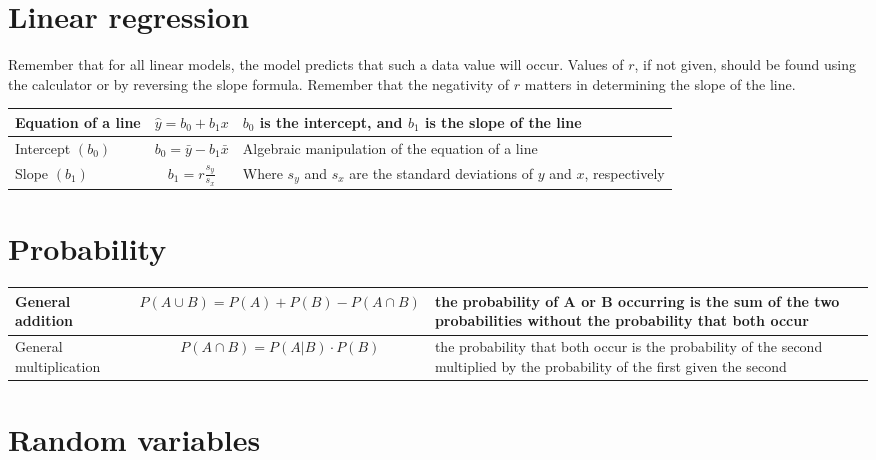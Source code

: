 \documentclass{article}
\begin{document}
\section{Linear regression}
Remember that for all linear models, the model predicts that such a data value will occur. Values of $r$, if not given, should be found using the calculator or by reversing the slope formula. Remember that the negativity of $r$ matters in determining the slope of the line.
\begin{center}
\begin{tabular}{ >{\centering\arraybackslash}m{4cm} c m{6cm} } \hline
Equation of a line & $\hat{y} = b_0 + b_1x$ & $b_0$ is the intercept, and $b_1$ is the slope of the line \\ \hline
Intercept $\left(b_0\right)$ & $b_0 = \bar{y} - b_1\bar{x}$ & Algebraic manipulation of the equation of a line \\ \hline
Slope $\left(b_1\right)$ & $b_1 = r \frac{s_y}{s_x}$ & Where $s_y$ and $s_x$ are the standard deviations of $y$ and $x$, respectively \\ \hline
\end{tabular}
\end{center}

\newpage
\section{Probability}
\begin{center}
\begin{tabular}{ >{\centering\arraybackslash}m{4cm} c m{6cm} } \hline
General addition & $P\left(A \cup B\right) = P\left(A\right) + P\left(B\right) - P\left(A \cap B \right) $ & the probability of A or B occurring is the sum of the two probabilities without the probability that both occur \\ \hline
General multiplication & $P\left(A \cap B \right) = P\left(A|B \right) \cdot P\left(B \right)$ & the probability that both occur is the probability of the second multiplied by the probability of the first given the second \\ \hline
\end{tabular}
\end{center}

\section{Random variables}
\end{document}
